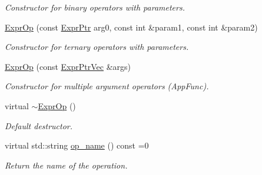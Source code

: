 \begin{DoxyCompactItemize}
\begin{DoxyCompactList}\small\item\em Constructor for binary operators with parameters. \end{DoxyCompactList}\item 
\mbox{\label{classilang_1_1_expr_op_abe0412fc5f85aad9e27ce798eb6652e8}} 
\mbox{\hyperlink{classilang_1_1_expr_op_abe0412fc5f85aad9e27ce798eb6652e8}{Expr\+Op}} (const \mbox{\hyperlink{classilang_1_1_expr_a85952b6a34620c4c8cab6bac9c9fdf8c}{Expr\+Ptr}} arg0, const int \&param1, const int \&param2)
\begin{DoxyCompactList}\small\item\em Constructor for ternary operators with parameters. \end{DoxyCompactList}\item 
\mbox{\label{classilang_1_1_expr_op_a825fc3cad02ba4ac107490ec66faaafb}} 
\mbox{\hyperlink{classilang_1_1_expr_op_a825fc3cad02ba4ac107490ec66faaafb}{Expr\+Op}} (const \mbox{\hyperlink{classilang_1_1_expr_a17efc8282f647681d37cd4c78928aa01}{Expr\+Ptr\+Vec}} \&args)
\begin{DoxyCompactList}\small\item\em Constructor for multiple argument operators (App\+Func). \end{DoxyCompactList}\item 
\mbox{\label{classilang_1_1_expr_op_a558f4e9dfc66ee008fc64dd6bf019160}} 
virtual \mbox{\hyperlink{classilang_1_1_expr_op_a558f4e9dfc66ee008fc64dd6bf019160}{$\sim$\+Expr\+Op}} ()
\begin{DoxyCompactList}\small\item\em Default destructor. \end{DoxyCompactList}\item 
\mbox{\label{classilang_1_1_expr_op_a0d094158b840e6b21ef979b926154dbf}} 
virtual std\+::string \mbox{\hyperlink{classilang_1_1_expr_op_a0d094158b840e6b21ef979b926154dbf}{op\+\_\+name}} () const =0
\begin{DoxyCompactList}\small\item\em Return the name of the operation. \end{DoxyCompactList}\item 
\mbox{\label{classilang_1_1_expr_op_aed280897e924cf962212e1d97866c953}} 

\end{DoxyCompactItemize}

